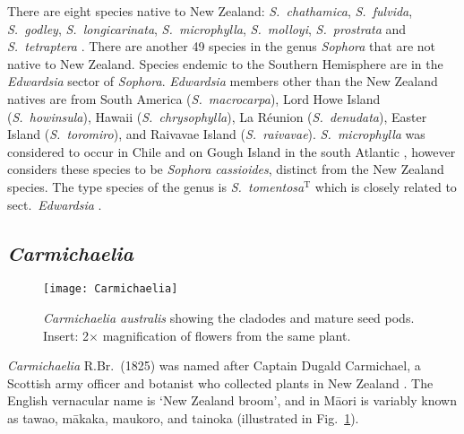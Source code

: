 There are eight species native to New Zealand: \emph{S.~chathamica},
\emph{S.~fulvida}, \emph{S.~godley}, \emph{S.~longicarinata},
\emph{S.~microphylla}, \emph{S.~molloyi}, \emph{S.~prostrata} and
\emph{S.~tetraptera} \citep{Heenan01c}. There are another 49 species
in  the genus \emph{Sophora} that are not native to New Zealand.
Species endemic to the Southern Hemisphere are in the
\emph{Edwardsia} sector of \emph{Sophora}. \emph{Edwardsia} members
other than the New Zealand natives are from South America
(\emph{S.~macrocarpa}), Lord Howe Island (\emph{S.~howinsula}),
Hawaii (\emph{S.~chrysophylla}), La R\'eunion (\emph{S.~denudata}),
Easter Island (\emph{S.~toromiro}), and Raivavae Island
(\emph{S.~raivavae}). \emph{S.~microphylla} was considered to occur
in Chile and on Gough Island in the south Atlantic
\citep{Markham72}, however \citet{Heenan01a} considers these species
to be \emph{Sophora cassioides}, distinct from the New Zealand
species. The type species of the genus is
\emph{S.~tomentosa}$^{\mathrm{T}}$ which is closely related to
sect.~\emph{Edwardsia} \citep{Heenan04,ILDIS}.

\subsection{\emph{Carmichaelia}}

\begin{figure} [tb]
    \centering
    \texttt{[image: Carmichaelia]}
    \caption[\emph{Carmichaelia australis}]{\emph{Carmichaelia australis}
    showing the cladodes and mature seed pods. Insert: 2$\times$ magnification
    of flowers from the same plant.}
    \label{p-Carmichaelia}
\end{figure}

\emph{Carmichaelia} R.Br.~(1825) was named after Captain Dugald
Carmichael, a Scottish army officer and botanist who collected
plants in New Zealand \citep{Allen81}. The English vernacular name
is `New Zealand broom', and in M\=aori is variably known  as tawao,
m\=akaka, maukoro, and tainoka \citep{NZPlant} (illustrated in
Fig.~\ref{p-Carmichaelia}).

